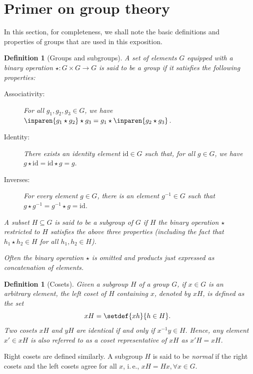 \documentclass[11pt]{article}
\newtheorem{definition}[theorem]{Definition}
\newcommand{\ie}{i.\,e.}
\begin{document}
\section{Primer on group theory}\label{sec:group}

In this section, for completeness,  we shall note the basic definitions and properties of groups that are used in this exposition. 

\begin{definition}[Groups and subgroups]
  A set of elements $G$ equipped with a binary operation $\star: G \times G \rightarrow G$ is said to be a \emph{group} if it satisfies the following properties:
  \begin{description}
  \item[Associativity:] For all $g_1,g_2,g_3 \in G$, we have $\inparen{g_1 \star g_2} \star g_3 = g_1 \star \inparen{g_2 \star g_3}$.
  \item[Identity:] There exists an \emph{identity} element $\mathrm{id} \in G$ such that, for all $g\in G$, we have $g \star \mathrm{id} = \mathrm{id} \star g = g$.
  \item[Inverses:] For every element $g \in G$, there is an element $g^{-1} \in G$ such that $g \star g^{-1} = g^{-1} \star g = \mathrm{id}$. 
  \end{description}
  
  
  A subset $H \subseteq G$ is said to be a \emph{subgroup} of $G$ if
  $H$ the binary operation $\star$ restricted to $H$ satisfies  the
  above three properties (including the fact that $h_1 \star h_2 \in
  H$ for all $h_1,h_2 \in H$).

   \medskip

  Often the binary operation $\star$ is omitted and products just expressed as concatenation of elements.

 
\end{definition}

\begin{definition}[Cosets]
Given a subgroup $H$ of a group $G$, if $x \in G$ is an arbitrary element, the 
%
\emph{left coset}      %
of $H$ containing $x$, denoted by $x H$, is defined as the set
\[
x H = \setdef{x h}{h\in H}.
\]
Two cosets $x H$ and $y H$ are identical if and only if $x^{-1} y \in H$. Hence,
any element $x'\in x H$ is also referred to as a \emph{coset representative} of
$x H$ as $x' H = x H$. 
\end{definition}

%
Right cosets  %
are defined similarly. A subgroup $H$ is said to be
\emph{normal} if the
%
right cosets and the left cosets  %
agree for all $x$,
\ie, $xH = Hx, \forall x \in G$. 
\end{document}
